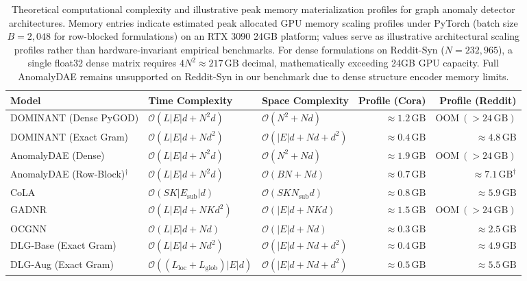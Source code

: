 \documentclass[applsci,article,submit,moreauthors,pdftex]{Definitions/mdpi}
\begin{document}
\begin{table}[htbp]
\centering\footnotesize\setlength{\tabcolsep}{3pt}
\caption{Theoretical computational complexity and illustrative peak memory materialization profiles for graph anomaly detector architectures. Memory entries indicate estimated peak allocated GPU memory scaling profiles under PyTorch (batch size $B=2{,}048$ for row-blocked formulations) on an RTX 3090 24GB platform; values serve as illustrative architectural scaling profiles rather than hardware-invariant empirical benchmarks. For dense formulations on Reddit-Syn ($N=232,965$), a single float32 dense matrix requires $4 N^2 \approx 217\,\mathrm{GB}$ decimal, mathematically exceeding 24GB GPU capacity. Full AnomalyDAE remains unsupported on Reddit-Syn in our benchmark due to dense structure encoder memory limits.}
\label{tab:complexity_comparison}
\begin{tabularx}{\textwidth}{lXXrr}\toprule
\textbf{Model} & \textbf{Time Complexity} & \textbf{Space Complexity} & \textbf{Profile (Cora)} & \textbf{Profile (Reddit)} \\\midrule
DOMINANT (Dense PyGOD) & $\mathcal{O}(L |E| d + N^2 d)$ & $\mathcal{O}(N^2 + N d)$ & $\approx 1.2\,\mathrm{GB}$ & $\mathrm{OOM}\ (>24\,\mathrm{GB})$ \\
DOMINANT (Exact Gram) & $\mathcal{O}(L |E| d + N d^2)$ & $\mathcal{O}(|E| d + N d + d^2)$ & $\approx 0.4\,\mathrm{GB}$ & $\approx 4.8\,\mathrm{GB}$ \\
AnomalyDAE (Dense) & $\mathcal{O}(L |E| d + N^2 d)$ & $\mathcal{O}(N^2 + N d)$ & $\approx 1.9\,\mathrm{GB}$ & $\mathrm{OOM}\ (>24\,\mathrm{GB})$ \\
AnomalyDAE (Row-Block)$^\dagger$ & $\mathcal{O}(L |E| d + N^2 d)$ & $\mathcal{O}(B N + N d)$ & $\approx 0.7\,\mathrm{GB}$ & $\approx 7.1\,\mathrm{GB}^\dagger$ \\
CoLA & $\mathcal{O}(S K |E_{\mathrm{sub}}| d)$ & $\mathcal{O}(S K N_{\mathrm{sub}} d)$ & $\approx 0.8\,\mathrm{GB}$ & $\approx 5.9\,\mathrm{GB}$ \\
GADNR & $\mathcal{O}(L |E| d + N K d^2)$ & $\mathcal{O}(|E| d + N K d)$ & $\approx 1.5\,\mathrm{GB}$ & $\mathrm{OOM}\ (>24\,\mathrm{GB})$ \\
OCGNN & $\mathcal{O}(L |E| d + N d)$ & $\mathcal{O}(|E| d + N d)$ & $\approx 0.3\,\mathrm{GB}$ & $\approx 2.5\,\mathrm{GB}$ \\
DLG-Base (Exact Gram) & $\mathcal{O}(L |E| d + N d^2)$ & $\mathcal{O}(|E| d + N d + d^2)$ & $\approx 0.4\,\mathrm{GB}$ & $\approx 4.9\,\mathrm{GB}$ \\
DLG-Aug (Exact Gram) & $\mathcal{O}((L_{\mathrm{loc}} + L_{\mathrm{glob}}) |E| d)$ & $\mathcal{O}(|E| d + N d + d^2)$ & $\approx 0.5\,\mathrm{GB}$ & $\approx 5.5\,\mathrm{GB}$ \\\bottomrule
\end{tabularx}
\end{table}
\end{document}
